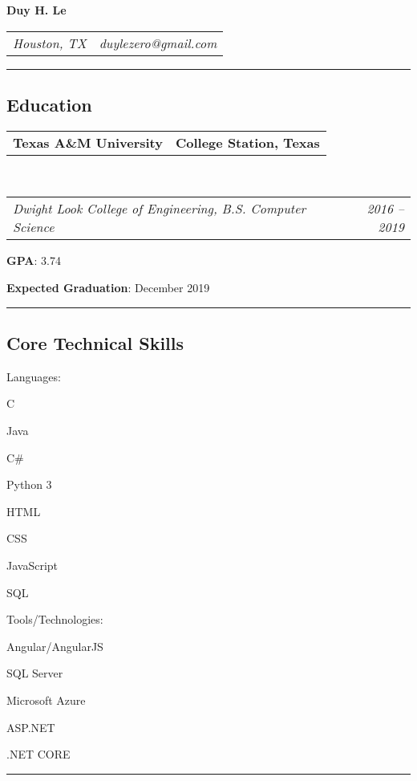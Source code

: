 \documentclass[10pt,letterpaper]{article}
\makeatletter
\newenvironment{indentsection}[1]%
{\begin{list}{}%
	{\setlength{\leftmargin}{#1}}%
	\item[]%
}
{\end{list}}
\newcommand{\headerrow}[2]
{\begin{tabular*}{\linewidth}{l@{\extracolsep{\fill}}r}
	#1 &
	#2 \\
\end{tabular*}}
\newcommand{\CPP}
{C\nolinebreak[4]\hspace{-.05em}\raisebox{.22ex}{\footnotesize\bf ++}}
\makeatother
\begin{document}
\begin{center}
{\LARGE \textbf{Duy H. Le}}
\end{center}
	\headerrow
		{\emph{Houston, TX}}
		{\emph{duylezero@gmail.com}}
\hrule
\vspace{-0.8em}
\subsection*{Education}

	\headerrow
		{\textbf{Texas A\&M University}}
		{\textbf{College Station, Texas}}
	\\
	\headerrow
		{\emph{Dwight Look College of Engineering, B.S. Computer Science}}
		{\emph{2016 -- 2019}}
	\begin{itemize*}
		\item \textbf{GPA}: 3.74
		\item \textbf{Expected Graduation}: December 2019
	\end{itemize*}

\hrule
\vspace{-0.8em}
\subsection*{Core Technical Skills}
\vspace{-0.4em}
\begin{indentsection}{\parindent}
\begin{description*}
	\item[Languages:]
	\begin{inparaitem}
 		\CPP
		\item Java
		\item C\#
		\item Python 3
		\item HTML
		\item CSS
		\item JavaScript
		\item SQL
	\end{inparaitem}
	\item[Tools/Technologies:]
		\begin{inparaitem}
 		 Angular/AngularJS
		\item SQL Server
		\item Microsoft Azure
		\item ASP.NET
		\item .NET CORE
	\end{inparaitem}
\end{description*}
\end{indentsection}
\hrule
\vspace{-0.8em}
\end{document}
